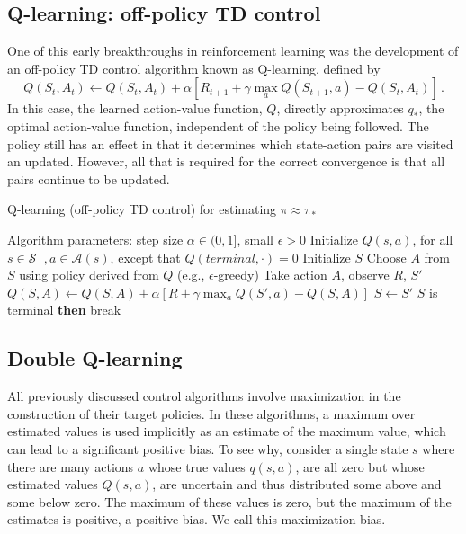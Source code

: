 \documentclass[12pt]{article}
\newcommand{\<}{\langle}
\renewcommand{\>}{\rangle}
\renewcommand{\S}{\mathcal{S}}
\newcommand{\A}{\mathcal{A}}
\begin{document}
%
%
%

\subsection{Q-learning: off-policy TD control}

One of this early breakthroughs in reinforcement learning was the development of an off-policy TD control algorithm known as Q-learning, defined by
\begin{equation}
Q(S_t,A_t) \leftarrow Q(S_t,A_t) + \alpha[ R_{t+1} + \gamma \max_a Q(S_{t+1},a) - Q(S_t,A_t)]\,.
\end{equation}
In this case, the learned action-value function, $Q$, directly approximates $q_*$, the optimal action-value function, independent of the policy being followed. The policy still has an effect in that it determines which state-action pairs are visited an updated. However, all that is required for the correct convergence is that all pairs continue to be updated.

\begin{algorithm}
\caption{Q-learning (off-policy TD control) for estimating $\pi \approx \pi_*$}
\begin{algorithmic}
\State Algorithm parameters: step size $\alpha\in (0,1]$, small $\epsilon > 0$
\State Initialize $Q(s,a)$, for all $s\in\S^+, a\in\A(s)$, except that $Q(terminal,\cdot)=0$ 
\medskip
{}
  \State Initialize $S$
    \State Choose $A$ from $S$ using policy derived from $Q$ (e.g., $\epsilon$-greedy)
    \State Take action $A$, observe $R$, $S'$
    \State $Q(S,A) \leftarrow Q(S,A) + \alpha [R + \gamma \max_a Q(S',a) - Q(S,A)]$
    \State $S\leftarrow S'$
     $S$ is terminal {\bf then} break
  \EndFor
\EndFor
\end{algorithmic}
\end{algorithm}

%
%
%

\subsection{Double Q-learning}

All previously discussed control algorithms involve maximization in the construction of their target policies. In these algorithms, a maximum over estimated values is used implicitly as an estimate of the maximum value, which can lead to a significant positive bias. To see why, consider a single state $s$ where there are many actions $a$ whose true values $q(s,a)$, are all zero but whose estimated values $Q(s,a)$, are uncertain and thus distributed some above and some below zero. The maximum of these values is zero, but the maximum of the estimates is positive, a positive bias. We call this maximization bias.
\end{document}

